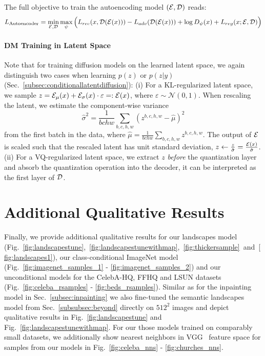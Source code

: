 \documentclass[10pt,twocolumn,letterpaper]{article}
\begin{document}
The full objective to train the autoencoding model $(\mathcal{E}, \mathcal{D})$ reads: 
\begin{equation}
L_{\text{Autoencoder}} =  \min_{\mathcal{E}, \mathcal{D}} \max_\psi \Big( L_{rec}(x, \mathcal{D}(\mathcal{E}(x))) - L_{adv}(\mathcal{D}(\mathcal{E}(x))) + \log D_{\psi}(x) + L_{reg}(x; \mathcal{E}, \mathcal{D}) \Big)
\label{eq:firststageloss}
\end{equation}

\paragraph{DM Training in Latent Space}
Note that for training diffusion models on the learned latent space, we again distinguish two cases
%
when learning $p(z)$ or $p(z\vert y)$ (Sec.~\ref{subsec:conditionallatentdiffusion}):
(i) For a KL-regularized latent space, we sample $z = \mathcal{E}_\mu(x) + \mathcal{E}_\sigma(x) \cdot \varepsilon =: \mathcal{E}(x)$, where 
$\varepsilon \sim \mathcal{N}(0, 1)$.
When rescaling the latent, we estimate the component-wise variance $$\hat{\sigma}^2 = \frac{1}{b c h w}\sum_{b, c, h, w} (z^{b, c, h, w} - \hat{\mu})^2$$
from the first batch in the data, where $\hat{\mu} = \frac{1}{b c h w}\sum_{b, c, h, w} z^{b, c, h, w}$.
The output of $\mathcal{E}$ is scaled such that the rescaled latent has unit standard deviation, \ie
$z \leftarrow \frac{z}{\hat{\sigma}} = \frac{\mathcal{E}(x)}{\hat{\sigma}}$.
(ii) For a VQ-regularized latent space, we extract $z$ \emph{before} the quantization layer and absorb the quantization operation
into the decoder, \ie it can be interpreted as the first layer of $\mathcal{D}$.

%
%
%
%
%
%
%
%
%
%
%
%
%
%
%
%
%
%
%
%
%
%
%
%
%
%
%
%
%
%
%
%


%
%
%
%
%
%
%
%
%
%
%
%
%
%
%

\section{Additional Qualitative Results}
Finally, we provide additional qualitative results for our landscapes model (Fig.~\ref{fig:landscapestune},~\ref{fig:landscapestunewithmap},~\ref{fig:thickersample}~and~\ref{fig:landscapes1}), our class-conditional ImageNet model (Fig.~\ref{fig:imagenet_samples_1} - \ref{fig:imagenet_samples_2}) and our unconditional models for the CelebA-HQ, FFHQ and LSUN datasets (Fig.~\ref{fig:celeba_rsamples} - \ref{fig:beds_rsamples}). 
Similar as for the inpainting model in Sec.~\ref{subsec:inpainting} we also fine-tuned the semantic landscapes model from Sec.~\ref{subsubsec:beyond} directly on $512^2$ images and depict qualitative 
results in Fig.~\ref{fig:landscapestune} and Fig.~\ref{fig:landscapestunewithmap}.
For our those models trained on comparably small datasets, we additionally show nearest neighbors in VGG~\cite{simonyan2015VGG} feature space for samples from our models in Fig.~\ref{fig:celeba_nns} - \ref{fig:churches_nns}. 
\end{document}
